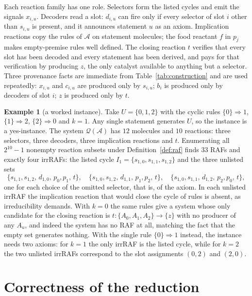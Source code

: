 \documentclass[11pt,a4paper]{article}
\theoremstyle{plain}
\theoremstyle{definition}
\newtheorem{example}[theorem]{Example}
\theoremstyle{remark}
\newcommand{\cA}{\mathcal{A}}
\newcommand{\cQ}{\mathcal{Q}}
\begin{document}
Each reaction family has one role. Selectors form the listed cycles and emit the signals $x_{i,u}$. Decoders read a slot: $d_{i,u}$ can fire only if every selector of slot $i$ other than $s_{i,u}$ is present, and it announces statement $u$ as an axiom. Implication reactions copy the rules of $\cA$ on statement molecules; the food reactant $f$ in $p_j$ makes empty-premise rules well defined. The closing reaction $t$ verifies that every slot has been decoded and every statement has been derived, and pays for that verification by producing $z$, the only catalyst available to anything but a selector. Three provenance facts are immediate from Table~\ref{tab:construction} and are used repeatedly: $x_{i,u}$ and $c_{i,u}$ are produced only by $s_{i,u}$; $b_i$ is produced only by decoders of slot $i$; $z$ is produced only by $t$.

\begin{example}[a worked instance]\label{ex:worked}
Take $U=\{0,1,2\}$ with the cyclic rules $\{0\}\Rightarrow1$, $\{1\}\Rightarrow2$, $\{2\}\Rightarrow0$ and $k=1$. Any single statement generates $U$, so the instance is a yes-instance. The system $\cQ(\cA)$ has $12$ molecules and $10$ reactions: three selectors, three decoders, three implication reactions and $t$. Enumerating all $2^{10}-1$ nonempty reaction subsets under Definition~\ref{def:raf} finds $33$ RAFs and exactly four irrRAFs: the listed cycle $I_1=\{s_{1,0},s_{1,1},s_{1,2}\}$ and the three unlisted sets
\[
\{s_{1,1},s_{1,2},\,d_{1,0},\,p_0,p_1,\,t\},\quad
\{s_{1,0},s_{1,2},\,d_{1,1},\,p_1,p_2,\,t\},\quad
\{s_{1,0},s_{1,1},\,d_{1,2},\,p_2,p_0,\,t\},
\]
one for each choice of the omitted selector, that is, of the axiom. In each unlisted irrRAF the implication reaction that would close the cycle of rules is absent, as irreducibility demands. With $k=0$ the same rules give a system whose only candidate for the closing reaction is $t\colon\{A_0,A_1,A_2\}\to\{z\}$ with no producer of any $A_u$, and indeed the system has no RAF at all, matching the fact that the empty set generates nothing. With the single rule $\{0\}\Rightarrow1$ instead, the instance needs two axioms: for $k=1$ the only irrRAF is the listed cycle, while for $k=2$ the two unlisted irrRAFs correspond to the slot assignments $(0,2)$ and $(2,0)$.
\end{example}

\section{Correctness of the reduction}\label{sec:correctness}
\end{document}

